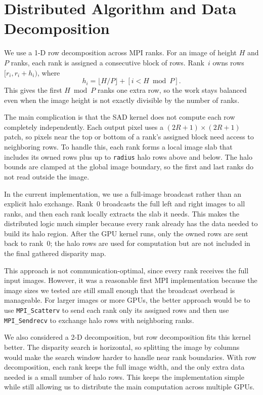 \documentclass[11pt]{article}
\begin{document}
\section{Distributed Algorithm and Data Decomposition}

We use a 1-D row decomposition across MPI ranks. For an image of height $H$ and
$P$ ranks, each rank is assigned a consecutive block of rows. Rank~$i$ owns rows
$[r_i, r_i + h_i)$, where
\[
h_i = \lfloor H/P \rfloor + [i < H \bmod P].
\]
This gives the first $H \bmod P$ ranks one extra row, so the work stays balanced
even when the image height is not exactly divisible by the number of ranks.

The main complication is that the SAD kernel does not compute each row completely
independently. Each output pixel uses a $(2R+1)\times(2R+1)$ patch, so pixels near
the top or bottom of a rank's assigned block need access to neighboring rows. To
handle this, each rank forms a local image slab that includes its owned rows plus
up to \texttt{radius} halo rows above and below. The halo bounds are clamped at the
global image boundary, so the first and last ranks do not read outside the image.

In the current implementation, we use a full-image broadcast rather than an explicit
halo exchange. Rank~0 broadcasts the full left and right images to all ranks, and
then each rank locally extracts the slab it needs. This makes the distributed logic
much simpler because every rank already has the data needed to build its halo region.
After the GPU kernel runs, only the owned rows are sent back to rank~0; the halo rows
are used for computation but are not included in the final gathered disparity map.

This approach is not communication-optimal, since every rank receives the full input
images. However, it was a reasonable first MPI implementation because the image sizes
we tested are still small enough that the broadcast overhead is manageable. For larger
images or more GPUs, the better approach would be to use \texttt{MPI\_Scatterv} to
send each rank only its assigned rows and then use \texttt{MPI\_Sendrecv} to exchange
halo rows with neighboring ranks.

We also considered a 2-D decomposition, but row decomposition fits this kernel better.
The disparity search is horizontal, so splitting the image by columns would make the
search window harder to handle near rank boundaries. With row decomposition, each
rank keeps the full image width, and the only extra data needed is a small number of
halo rows. This keeps the implementation simple while still allowing us to distribute
the main computation across multiple GPUs.
\end{document}
